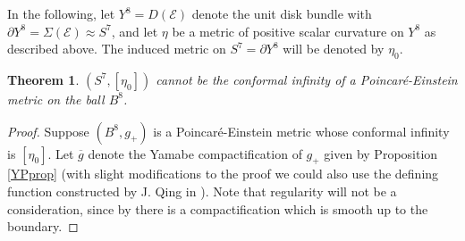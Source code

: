 \documentclass{amsart}
\newtheorem{theorem}{Theorem}[section]
\theoremstyle{definition}
\theoremstyle{remark}
\numberwithin{equation}{section}
\begin{document}
In the following, let $Y^8 = D(\mathcal{E})$ denote the unit disk bundle with $\partial Y^8 = \Sigma(\mathcal{E}) \approx S^7$, and let $\eta$ be a metric of positive scalar curvature on $Y^8$ as described above.  The induced metric on $S^7 = \partial Y^8$ will be denoted by $\eta_0$.

\begin{theorem} \label{Cor2} $(S^7, [\eta_0])$ cannot be the conformal infinity of a Poincar\'e-Einstein metric on the ball $B^8$. \end{theorem}

\begin{proof}  Suppose $(B^8, g_{+})$ is a Poincar\'e-Einstein metric whose conformal infinity is $[\eta_0]$.  Let $\overline{g}$ denote the Yamabe compactification of $g_{+}$ given by Proposition \ref{YPprop} (with slight modifications to the proof we could also use the defining function constructed by J. Qing in \cite{JQ}).  Note that regularity will not be a consideration, since by \cite{CDLS} there is a compactification which is smooth up to the boundary.


\end{proof}
\end{document}
